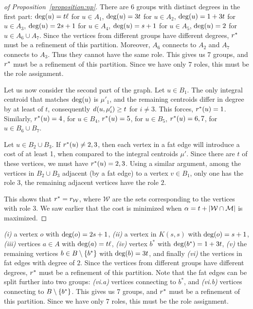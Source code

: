 \begin{proof}[of Proposition~\ref{proposition:np}]
There are 6 groups with distinct degrees in the first part:
$\dg{u} = t\ell$ for $u \in A_1$,
$\dg{u} = 3t$ for $u \in A_2$,
$\dg{u} = 1 + 3t$ for $u \in A_3$,
$\dg{u} = 2s + 1$ for $u \in A_4$,
$\dg{u} = s + 1$ for $u \in A_5$,
$\dg{u} = 2$ for $u \in A_6 \cup A_7$.
Since the vertices from different groups have different degrees, $r^*$
must be a refinement of this partition.
Moreover, $A_6$ connects to $A_2$ and $A_7$ connects to $A_3$.
Thus they cannot have the same role. 
This gives us 7 groups, and $r^*$ must be a refinement of this partition.
Since we have only 7 roles, this must be the role assignment.

Let us now consider the second part of the graph.
Let $u \in B_1$.
The only integral centroid that matches $\dg{u}$ is $\mu'_1$, and the
remaining centroids differ in degree
by at least of $t$, consequently $\dist{u, \mu'_i} \geq t$ for $i \neq 3$.
This forces, $r^*(u) = 1$. Similarly,
$r^*(u) = 4$, for $u \in B_4$, 
$r^*(u) = 5$, for $u \in B_5$,
$r^*(u) = 6, 7$, for $u \in B_6 \cup B_7$.

Let $u \in B_2 \cup B_3$. If $r^*(u) \neq 2, 3$, then each vertex in a fat edge will
introduce a cost of at least 1, when compared to the integral centroids $\mu'$.
Since there are $t$ of these vertices, we must have $r^*(u) = 2, 3$.  Using
a similar argument, among the vertices in $B_2 \cup B_3$ adjacent (by a fat edge) to a vertex $v \in B_1$,
only one has the role $3$, the remaining adjacent vertices have the role $2$.

This shows that $r^* = r_{\mathcal{W}}$, where $\mathcal{W}$ are the sets corresponding
to the vertices with role $3$. We saw earlier that the cost is minimized when $\alpha = t +
{\left|\mathcal{W} \cap \mathcal{M}\right|}$
is maximized.
\end{proof}


\iffalse
\emph{(i)} a vertex $o$ with $\dg{o} = 2s + 1$,
\emph{(ii)} a vertex in $K(s, s)$ with $\dg{o} = s + 1$,
\emph{(iii)} vertices $a \in A$ with $\dg{a} = t\ell$,
\emph{(iv)} vertex $b^*$ with $\dg{b^*} = 1 + 3t$,
\emph{(v)} the remaining vertices $b \in B \setminus \left\{b^*\right\}$ with $\dg{b} = 3t$, and finally
\emph{(vi)} the vertices in fat edges with degree of $2$.
Since the vertices from different groups have different degrees, $r^*$
must be a refinement of this partition. Note that the fat edges can be split further into
two groups:
\emph{(vi.a)} vertices connecting to $b^*$, and
\emph{(vi.b)} vertices connecting to $B \setminus \left\{b^*\right\}$.
This gives us 7 groups, and $r^*$ must be a refinement of this partition.
Since we have only 7 roles, this must be the role assignment.


